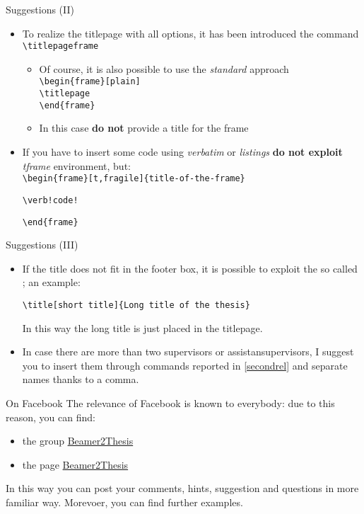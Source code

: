 \begin{frame}[fragile]{Suggestions (II)}
\begin{itemize}
\item To realize the titlepage with all options, it has been introduced the command \verb!\titlepageframe!
\begin{itemize}
\item Of course, it is also possible to use the \emph{standard} approach\\
\verb!\begin{frame}[plain]!\\
\verb!\titlepage! \\
\verb!\end{frame}!
\item In this case \textbf{do not} provide a title for the frame
\end{itemize}
\item If you have to insert some code using \emph{verbatim} or \emph{listings} \textbf{do not exploit} \emph{tframe} environment, but:\\
\verb!\begin{frame}[t,fragile]{title-of-the-frame}!
\begin{verbatim}
\verb!code!
\end{verbatim}
\verb!\end{frame}!
\end{itemize}
\end{frame}

\begin{frame}[t,fragile]{Suggestions (III)}
\begin{itemize}
\item If the title does not fit in the footer box, it is possible to exploit the so called ; an example:
\begin{verbatim}
\title[short title]{Long title of the thesis}
\end{verbatim}
In this way the long title is just placed in the titlepage.
\item In case there are more than two supervisors or assistansupervisors, I suggest you to insert them through commands reported in \ref{secondrel} and separate names thanks to a comma.
\end{itemize}
\end{frame}

\begin{tframe}{On Facebook}
The relevance of Facebook is known to everybody: due to this reason, you can find:
\begin{itemize}
\item the group \href{https://www.facebook.com/\#!/groups/beamer2thesis/}{Beamer2Thesis}
\item the page \href{https://www.facebook.com/\#!/pages/Beamer2Thesis/112814205489099}{Beamer2Thesis}
\end{itemize} 
In this way you can post your comments, hints, suggestion and questions in more familiar way. Morevoer, you can find further examples.
\end{tframe}

